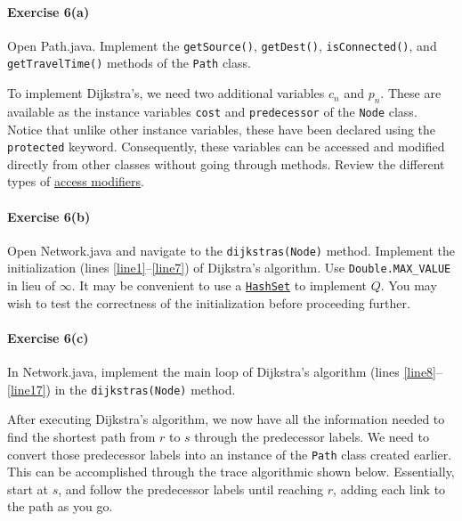 \documentclass[12pt]{article}
\begin{document}
\paragraph*{Exercise 6(a)} Open Path.java. Implement the \texttt{getSource()}, \texttt{getDest()}, \texttt{isConnected()}, and \texttt{getTravelTime()}  methods of the \texttt{Path} class.


\vspace{\baselineskip}

\noindent
To implement Dijkstra's, we need two additional variables $c_n$ and $p_n$. These are available as the instance variables \texttt{cost} and \texttt{predecessor} of the \texttt{Node} class. Notice that unlike other instance variables, these have been declared using the \texttt{protected} keyword. Consequently, these variables can be accessed and modified directly from other classes without going through methods. Review the different types of \href{https://www.w3schools.com/java/java_modifiers.asp}{access modifiers}.


\paragraph*{Exercise 6(b)} Open Network.java and navigate to the \texttt{dijkstras(Node)} method. Implement the initialization (lines \ref{line1}--\ref{line7}) of Dijkstra's algorithm. Use \texttt{Double.MAX\_VALUE} in lieu of $\infty$. 
It may be convenient to use a \href{https://www.w3schools.com/java/java_hashset.asp}{\texttt{HashSet}} to implement $Q$. You may wish to test the correctness of the initialization before proceeding further. 


\paragraph*{Exercise 6(c)} In Network.java, implement the main loop of Dijkstra's algorithm (lines \ref{line8}--\ref{line17}) in the \texttt{dijkstras(Node)} method. 

\vspace{\baselineskip}

\noindent
After executing Dijkstra's algorithm, we now have all the information needed to find the shortest path from $r$ to $s$ through the predecessor labels. We need to convert those predecessor labels into an instance of the \texttt{Path} class created earlier. This can be accomplished through the trace algorithmic shown below. Essentially, start at $s$, and follow the predecessor labels until reaching $r$, adding each link to the path as you go. 
\end{document}
